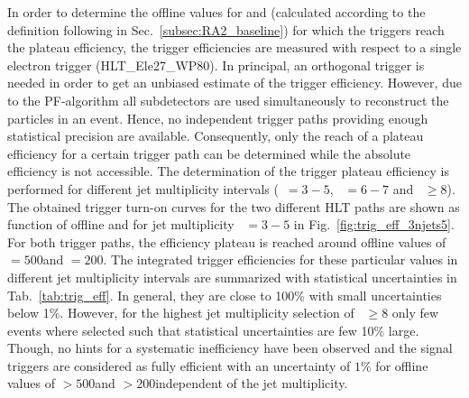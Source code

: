 In order to determine the offline values for \HT and \MHT (calculated according to the definition following in Sec.~\ref{subsec:RA2_baseline}) for which the triggers reach the plateau efficiency, the trigger efficiencies are measured with respect to a single electron trigger (HLT\_Ele27\_WP80). In principal, an orthogonal trigger is needed in order to get an unbiased estimate of the trigger efficiency. However, due to the PF-algorithm all subdetectors are used simultaneously to reconstruct the particles in an event. Hence, no independent trigger paths providing enough statistical precision are available. Consequently, only the reach of a plateau efficiency for a certain trigger path can be determined while the absolute efficiency is not accessible. The determination of the trigger plateau efficiency is performed for different jet multiplicity intervals (\NJets~$ = 3-5$, \NJets~$ = 6-7$ and \NJets~$ \ge 8$). The obtained trigger turn-on curves for the two different HLT paths are shown as function of offline \HT and \MHT for jet multiplicity \NJets~$ = 3-5$ in Fig.~\ref{fig:trig_eff_3njets5}. For both trigger paths, the efficiency plateau is reached around offline values of \HT$ = 500$\gev and \MHT$ = 200$\gev. The integrated trigger efficiencies for these particular values in different jet multiplicity intervals are summarized with statistical uncertainties in Tab.~\ref{tab:trig_eff}. In general, they are close to 100\% with small uncertainties below 1\%. However, for the highest jet multiplicity selection of \NJets~$ \ge 8$ only few events where selected such that statistical uncertainties are few 10\% large. Though, no hints for a systematic inefficiency have been observed and the signal triggers are considered as fully efficient with an uncertainty of $1\%$ for offline values of \HT$ > 500$\gev and \MHT$ > 200$\gev independent of the jet multiplicity. \\


